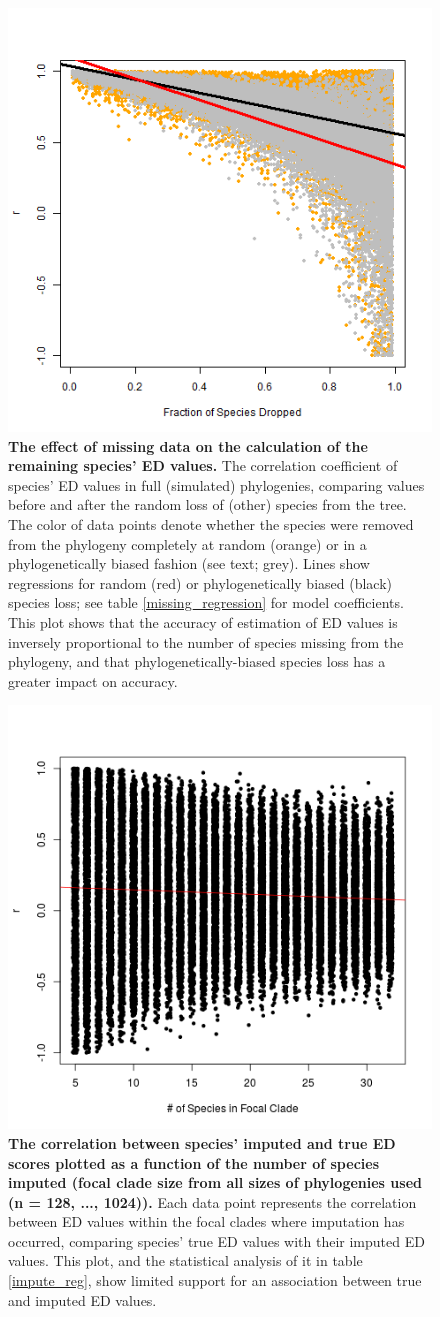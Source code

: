 \documentclass[10pt,english]{article}
\begin{document}
\begin{figure}[!ht]
  \center
  \includegraphics[width=.5\textwidth]{randomVsCluster.png}
  \caption{\textbf{The effect of missing data on the calculation of the
      remaining species' ED values.} The correlation coefficient of species' ED
      values in full (simulated) phylogenies, comparing values before and after
      the random loss of (other) species from the tree. The color of data points
      denote whether the species were removed from the phylogeny completely at
      random (orange) or in a phylogenetically biased fashion (see text; grey).
      Lines show regressions for random (red) or phylogenetically biased (black)
      species loss; see table \ref{missing_regression} for model coefficients.
      This plot shows that the accuracy of estimation of ED values is inversely
      proportional to the number of species missing from the phylogeny, and that
      phylogenetically-biased species loss has a greater impact on accuracy.}
  \label{randomVsClustered}
\end{figure}

\begin{figure}[!ht]
  \center
  \includegraphics[width=.5\textwidth]{edModel.png}
  \caption{\textbf{The correlation between species' imputed and true ED scores
      plotted as a function of the number of species imputed (focal clade size
      from all sizes of phylogenies used (n = 128, ..., 1024)).} Each data point
      represents the correlation between ED values within the focal clades where
      imputation has occurred, comparing species' true ED values with their
      imputed ED values. This plot, and the statistical analysis of it in table
      \ref{impute_reg}, show limited support for an association between true and
      imputed ED values.}
  \label{imputationTrend}
\end{figure}
\end{document}
